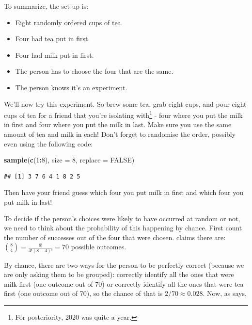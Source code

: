 \documentclass[
]{book}
\newenvironment{Shaded}{\begin{snugshade}}{\end{snugshade}}
\newcommand{\DataTypeTok}[1]{\textcolor[rgb]{0.13,0.29,0.53}{#1}}
\newcommand{\DecValTok}[1]{\textcolor[rgb]{0.00,0.00,0.81}{#1}}
\newcommand{\KeywordTok}[1]{\textcolor[rgb]{0.13,0.29,0.53}{\textbf{#1}}}
\newcommand{\NormalTok}[1]{#1}
\newcommand{\OperatorTok}[1]{\textcolor[rgb]{0.81,0.36,0.00}{\textbf{#1}}}
\newcommand{\OtherTok}[1]{\textcolor[rgb]{0.56,0.35,0.01}{#1}}
\providecommand{\tightlist}{%
  \setlength{\itemsep}{0pt}\setlength{\parskip}{0pt}}
\begin{document}
To summarize, the set-up is:

\begin{itemize}
\tightlist
\item
  Eight randomly ordered cups of tea.
\item
  Four had tea put in first.
\item
  Four had milk put in first.
\item
  The person has to choose the four that are the same.
\item
  The person knows it's an experiment.
\end{itemize}

We'll now try this experiment. So brew some tea, grab eight cups, and pour eight cups of tea for a friend that you're isolating with\footnote{For posteriority, 2020 was quite a year.} - four where you put the milk in first and four where you put the milk in last. Make sure you use the same amount of tea and milk in each! Don't forget to randomise the order, possibly even using the following code:

\begin{Shaded}
\begin{Highlighting}[]
\KeywordTok{sample}\NormalTok{(}\KeywordTok{c}\NormalTok{(}\DecValTok{1}\OperatorTok{:}\DecValTok{8}\NormalTok{), }\DataTypeTok{size =} \DecValTok{8}\NormalTok{, }\DataTypeTok{replace =} \OtherTok{FALSE}\NormalTok{)}
\end{Highlighting}
\end{Shaded}

\begin{verbatim}
## [1] 3 7 6 4 1 8 2 5
\end{verbatim}

Then have your friend guess which four you put milk in first and which four you put milk in last!

To decide if the person's choices were likely to have occurred at random or not, we need to think about the probability of this happening by chance. First count the number of successes out of the four that were chosen. \citet[p.14]{fisherdesignofexperiments} claims there are: \({8 \choose 4} = \frac{8!}{4!(8-4)!}=70\) possible outcomes.

By chance, there are two ways for the person to be perfectly correct (because we are only asking them to be grouped): correctly identify all the ones that were milk-first (one outcome out of 70) or correctly identify all the ones that were tea-first (one outcome out of 70), so the chance of that is \(2/70 \approx 0.028\). Now, as \citet[p.15]{fisherdesignofexperiments} says,
\end{document}
